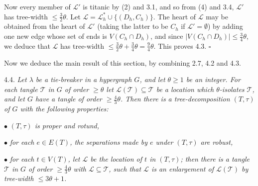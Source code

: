 Now every member of $\mathscr{L}'$ is titanic by (2) and 3.1, and so from (4) and 3.4, $\mathscr{L}'$ has tree-width $\le \frac{3}{2}\theta$. Let $\mathscr{L} = \mathscr{L}_h^* \cup \{(D_h, C_h)\}$. The heart of $\mathscr{L}$ may be obtained from the heart of $\mathscr{L}'$ (taking the latter to be $C_h$ if $\mathscr{L}' = \emptyset$) by adding one new edge whose set of ends is $V(C_h \cap D_h)$, and since $|V(C_h \cap D_h)| \le \frac{3}{4}\theta$, we deduce that $\mathscr{L}$ has tree-width $\le \frac{3}{2}\theta + \frac{3}{4}\theta = \frac{9}{4}\theta$. This proves 4.3. $\square$

Now we deduce the main result of this section, by combining 2.7, 4.2 and 4.3.

4.4. \textit{Let $\lambda$ be a tie-breaker in a hypergraph $G$, and let $\theta \ge 1$ be an integer. For each tangle $\mathscr{T}$ in $G$ of order $\ge \theta$ let $\mathscr{L}(\mathscr{T}) \subseteq \mathscr{T}$ be a location which $\theta$-isolates $\mathscr{T}$, and let $G$ have a tangle of order $\ge \frac{4}{3}\theta$. Then there is a tree-decomposition $(T, \tau)$ of $G$ with the following properties:}

\hspace*{12pt}$\bullet$ \textit{$(T, \tau)$ is proper and rotund,}

\hspace*{12pt}$\bullet$ \textit{for each $e \in E(T)$, the separations made by $e$ under $(T, \tau)$ are robust,}

\hspace*{12pt}$\bullet$ \textit{for each $t \in V(T)$, let $\mathscr{L}$ be the location of $t$ in $(T, \tau)$; then there is a tangle $\mathscr{T}$ in $G$ of order $\ge \frac{4}{3}\theta$ with $\mathscr{L} \subseteq \mathscr{T}$, such that $\mathscr{L}$ is an enlargement of $\mathscr{L}(\mathscr{T})$ by tree-width $\le 3\theta + 1$.}
